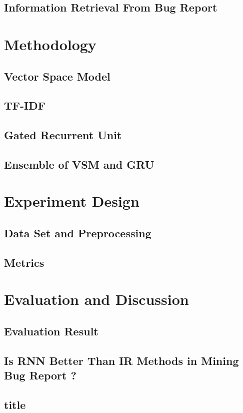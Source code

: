 \subsection{Information Retrieval From Bug Report}




\section{Methodology}

\subsection{Vector Space Model}

\subsection{TF-IDF}


\subsection{Gated Recurrent Unit}
	
\subsection{Ensemble of VSM and GRU}
	
\section{Experiment Design}

\subsection{Data Set and Preprocessing}

\subsection{Metrics}

\section{Evaluation and Discussion}

\subsection{Evaluation Result}

\subsection{Is RNN Better Than IR Methods in Mining Bug Report ?}

\subsection{title}








	 